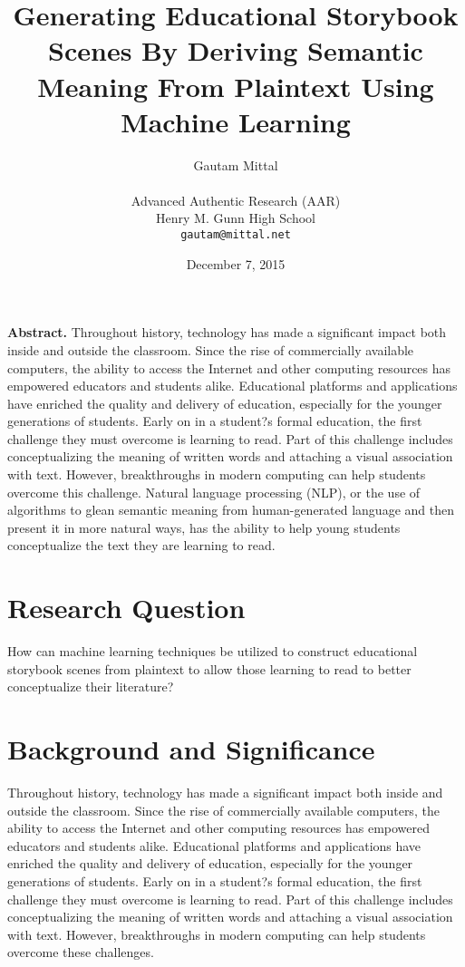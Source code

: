 \documentclass[12pt]{article}
\begin{document}
\title{\textbf{Generating Educational Storybook Scenes By Deriving Semantic Meaning From Plaintext Using Machine Learning}}
\author{Gautam Mittal\\\\
	Advanced Authentic Research (AAR)\\
        Henry M. Gunn High School\\
		\texttt{gautam@mittal.net}}
\date{December 7, 2015}
\maketitle

\textbf{Abstract.} Throughout history, technology has made a significant impact both inside and outside the classroom. Since the rise of commercially available computers, the ability to access the Internet and other computing resources has empowered educators and students alike. Educational platforms and applications have enriched the quality and delivery of education, especially for the younger generations of students. Early on in a student?s formal education, the first challenge they must overcome is learning to read. Part of this challenge includes conceptualizing the meaning of written words and attaching a visual association with text. However, breakthroughs in modern computing can help students overcome this challenge. Natural language processing (NLP), or the use of algorithms to glean semantic meaning from human-generated language and then present it in more natural ways, has the ability to help young students conceptualize the text they are learning to read.

\section{Research Question}
How can machine learning techniques be utilized to construct educational storybook scenes from plaintext to allow those learning to read to better conceptualize their literature?

\section{Background and Significance}
Throughout history, technology has made a significant impact both inside and outside the classroom. Since the rise of commercially available computers, the ability to access the Internet and other computing resources has empowered educators and students alike. Educational platforms and applications have enriched the quality and delivery of education, especially for the younger generations of students. Early on in a student?s formal education, the first challenge they must overcome is learning to read. Part of this challenge includes conceptualizing the meaning of written words and attaching a visual association with text. However, breakthroughs in modern computing can help students overcome these challenges.
\end{document}
